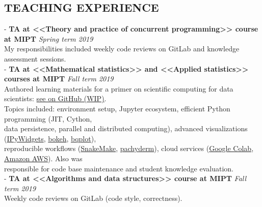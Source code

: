 \documentclass[11pt]{res}
\begin{document}
\begin{resume}
\section{TEACHING EXPERIENCE} 
\vspace{0.1cm}
- \textbf{TA at <<Theory and practice of concurrent programming>> course at MIPT} \hfill{} \textit{Spring term 2019}\\
\hphantom{-} My responsibilities included weekly code reviews on GitLab and knowledge assessment sessions. \vspace{0.2em}\\
- \textbf{TA at <<Mathematical statistics>> and <<Applied statistics>> courses at MIPT} \hfill{} \textit{Fall term 2019}\\
\hphantom{-} Authored learning materials for a primer on scientific computing for data scientists: \href{https://github.com/ivanov-v-v/scientific-computing-101}{see on GitHub (WIP)}.\\
\hphantom{-} Topics included: environment setup, Jupyter ecosystem, efficient Python programming (JIT, Cython,\\ 
\hphantom{-} data persistence, parallel and distributed computing), advanced visualizations (\href{https://ipywidgets.readthedocs.io/en/latest/}{IPyWidgets}, \href{https://docs.bokeh.org/en/latest/}{bokeh}, \href{https://github.com/bloomberg/bqplot}{bqplot}), \\\hphantom{-} reproducible workflows (\href{https://snakemake.readthedocs.io/en/stable/}{SnakeMake}, \href{https://github.com/pachyderm/pachyderm}{pachyderm}), cloud services (\href{https://colab.research.google.com}{Google Colab}, \href{https://aws.amazon.com}{Amazon AWS}). Also was \\\hphantom{-} responsible for code base maintenance and student knowledge evaluation.
\vspace{0.2em}\\
- \textbf{TA at <<Algorithms and data structures>> course at MIPT} \hfill{} \textit{Fall term 2019}\\
\hphantom{-} Weekly code reviews on GitLab (code style, correctness). \vspace{0.2em}

\end{resume}
\end{document}

